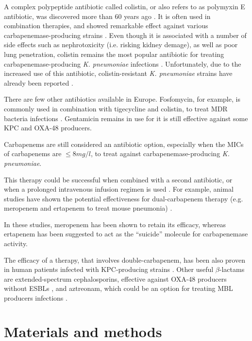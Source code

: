 \documentclass[11pt]{report}
\begin{document}
A complex polypeptide antibiotic called colistin, or also refers to as polymyxin E antibiotic, was discovered more than 60 years ago \cite{karaiskos2014multidrug, rodriguez2015diagnosis}.
It is often used in combination therapies, and showed remarkable effect against various carbapenemase-producing strains \cite{falagas2013antibiotic, temkin2014carbapenem}.
Even though it is associated with a number of side effects such as nephrotoxicity (i.e. risking kidney demage), as well as poor lung penetration, colistin remains the most popular antibiotic for treating carbapenemase-producing \emph{K. pneumoniae} infections \cite{karaiskos2014multidrug, rodriguez2015diagnosis}.
Unfortunately, due to the increased use of this antibiotic, 
colistin-resistant \emph{K. pneumoniae} strains have already been reported \cite{mammina2012ongoing}.

There are few other antibiotics available in Europe.
Fosfomycin, for example, is commonly used in combination with tigecycline and colistin, to treat MDR bacteria infections \cite{pontikis2014outcomes}.
Gentamicin remains in use for it is still effective against some KPC and OXA-48 producers.

Carbapenems are still considered an antibiotic option, especially when the MICs of carbapenems are $\le 8mg/l$, to treat against carbapenemase-producing \emph{K. pneumoniae}.

This therapy could be successful when combined with a second antibiotic, or when a prolonged intravenous infusion regimen is used \cite{tzouvelekis2014treating, daikos2014carbapenemase, tumbarello2012predictors}.
For example, animal studies have shown the potential effectiveness for dual-carbapenem therapy (e.g. meropenem and ertapenem to treat mouse pneumonia) 
\cite{wiskirchen2014vivo}.

In these studies, meropenem has been shown to retain its efficacy, whereas ertapenem has been suggested to act as the ``suicide'' molecule for carbapenemase activity.

The efficacy of a therapy, that involves double-carbapenem, has been also proven in human patients infected with KPC-producing strains \cite{giamarellou2013effectiveness}.
Other useful $\beta$-lactams are extended-spectrum cephalosporins, effective against OXA-48 producers without ESBLs \cite{mimoz2012broad}, and aztreonam, which could be an option for treating MBL producers infections \cite{nordmann2011emerging}.

\chapter{Materials and methods}
\end{document}

